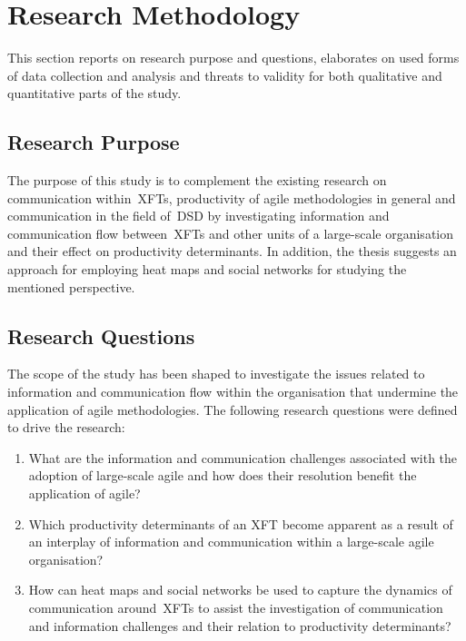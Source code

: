 \chapter{Research Methodology}
\label{chap:research-methodology}

This section reports on research purpose and questions, elaborates on used forms of data collection and analysis and threats to validity for both qualitative and quantitative parts of the study.  

\section{Research Purpose}

The purpose of this study is to complement the existing research on communication within~\acp{XFT}, productivity of agile methodologies in general and communication in the field of~\ac{DSD} by investigating information and communication flow between~\acp{XFT} and other units of a large-scale organisation and their effect on productivity determinants. In addition, the thesis suggests an approach for employing heat maps and social networks for studying the mentioned perspective.

\section{Research Questions}

The scope of the study has been shaped to investigate the issues related to information and communication flow within the organisation that undermine the application of agile methodologies. The following research questions were defined to drive the research:

\begin{enumerate}
   \item What are the information and communication challenges associated with the adoption of large-scale agile and how does their resolution benefit the application of agile?
   
   \item Which productivity determinants of an \ac{XFT} become apparent as a result of an interplay of information and communication within a large-scale agile organisation?
   
   \item How can heat maps and social networks be used to capture the dynamics of communication around~\acp{XFT} to assist the investigation of communication and information challenges and their relation to productivity determinants?
\end{enumerate}

